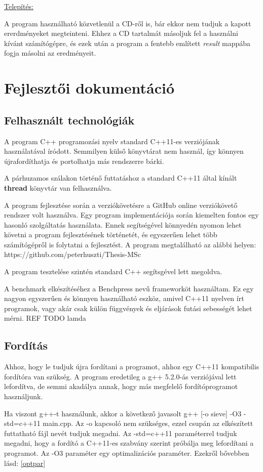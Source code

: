 \documentclass[twoside, a4paper, 12pt]{article}
\begin{document}
\noindent \underline{Telepítés:} \par
A program használható közvetlenül a CD-ről is, bár ekkor nem tudjuk a kapott ererdményeket megteinteni. Ehhez a CD tartalmát másoljuk fel a használni kívánt számítógépre, és ezek után a program a fentebb említett \textit{result} mappába fogja másolni az eredményeit.

\clearpage
\section{Fejlesztői dokumentáció}

\subsection{Felhasznált technológiák}
A program C++ programozási nyelv standard C++11-es verziójának használatával íródott. Semmilyen külső könyvtárat nem használ, így könnyen újrafordíthatja és portolhatja más rendszerre bárki. \par
A párhuzamos szálakon történő futtatáshoz a standard C++11 által kínált \textbf{thread} könyvtár van felhasználva. \par
A program fejlesztése során a verziókövetésre a GitHub online verziókövető rendszer volt használva. Egy program implementációja során kiemelten fontos egy hasonló szolgáltatás használata. Ennek segítségével könnyedén nyomon lehet követni a program fejlesztésének történetét, és egyszerűen lehet több számítógépről is folytatni a fejlesztést. A program megtalálható az alábbi helyen: https://github.com/peterhuszti/Thesis-MSc \par

A program tesztelése szintén standard C++ segítsgével lett megoldva. \par
A benchmark elkészítéséhez a Benchpress nevű frameworköt használtam. Ez egy nagyon egyszerűen és könnyen használható eszköz, amivel C++11 nyelven írt programok, vagy akár csak külön függvények és eljárások futási sebességét lehet mérni. REF
TODO lamda \par

\subsection{Fordítás} \label{build}

Ahhoz, hogy le tudjuk újra fordítani a programot, ahhoz egy C++11 kompatibilis fordítóra van szükség. A program eredetileg a g++ 5.2.0-ás verziójával lett lefordítva, de semmi akadálya annak, hogy más megfelelő fordítóprogramot használjunk. \par
Ha viszont g++-t használunk, akkor a következő javasolt g++ [-o sieve] -O3 -std=c++11 main.cpp. Az -o kapcsoló nem szükséges, ezzel csupán az elkészített futtatható fájl nevét tudjuk megadni. Az -std=c++11 paraméterrel tudjuk megadni, hogy a fordító a C++11-es szabvány szerint próbálja meg lefordítani a programot. Az -O3 paraméter egy optimalizációs paraméter. Ezekről bővebben lásd: \ref{optpar}
\end{document}
